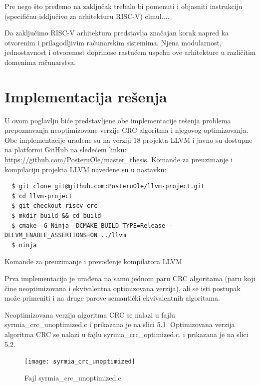 \documentclass[12pt,oneside]{memoir}
\begin{document}
Pre nego što pređemo na zaključak trebalo bi pomenuti i objasniti instrukciju 
(specifičnu isključivo za arhitekturu RISC-V) clmul....

Da zaključimo RISC-V arhitektura predstavlja značajan korak napred ka otvorenim 
i prilagodljivim računarskim sistemima. Njena modularnost, jednostavnost i 
otvorenost doprinose rastućem uspehu ove arhitekture u različitim domenima 
računarstva.

\chapter{Implementacija rešenja}
U ovom poglavlju biće predstavljene obe implementacije rešenja problema prepoznavanja 
neoptimizovane verzije CRC algoritma i njegovog optimizovanja. Obe implementacije urađene su na 
verziji 18 projekta LLVM i javno su dostupne na platformi GitHub na sledećem linku: 
\url{https://github.com/PosteruOle/master_thesis}. Komande za preuzimanje i kompilaciju projekta 
LLVM navedene su u nastavku:

\begin{listing}
\begin{verbatim}
  $ git clone git@github.com:PosteruOle/llvm-project.git
  $ cd llvm-project
  $ git checkout riscv_crc
  $ mkdir build && cd build
  $ cmake -G Ninja -DCMAKE_BUILD_TYPE=Release -DLLVM_ENABLE_ASSERTIONS=ON ../llvm
  $ ninja
\end{verbatim}
\caption{Komande za preuzimanje i prevođenje kompilatora LLVM}
\label{lst:llvm_compile_commands}
\end{listing}

Prva implementacija je urađena na samo jednom paru CRC algoritama (paru koji čine neoptimizovana 
i ekvivalentna optimizovana verzija), ali se isti postupak može primeniti i na druge parove 
semantički ekvivalentnih algoritama.

Neoptimizovana verzija algoritma CRC se nalazi u fajlu syrmia\_crc\_unoptimized.c i prikazana je na slici 5.1. Optimizovana verzija algoritma CRC se nalazi u fajlu syrmia\_crc\_optimized.c. i prikazana je na slici 5.2. 

%
\begin{figure}
\texttt{[image: syrmia\_crc\_unoptimized]}
\caption{Fajl syrmia\_crc\_unoptimized.c}
\centering
\end{figure}
\end{document}
